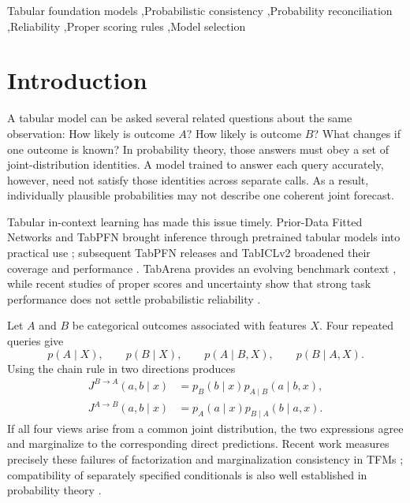 \documentclass[a4paper,fleqn]{cas-sc}
\newcommand{\Jone}{J^{B\rightarrow A}}
\newcommand{\Jtwo}{J^{A\rightarrow B}}
\begin{document}
\begin{keywords}
Tabular foundation models \sep Probabilistic consistency \sep Probability reconciliation \sep Reliability \sep Proper scoring rules \sep Model selection
\end{keywords}

\maketitle

\section{Introduction}
A tabular model can be asked several related questions about the same observation: How likely is outcome $A$? How likely is outcome $B$? What changes if one outcome is known? In probability theory, those answers must obey a set of joint-distribution identities. A model trained to answer each query accurately, however, need not satisfy those identities across separate calls. As a result, individually plausible probabilities may not describe one coherent joint forecast.

Tabular in-context learning has made this issue timely. Prior-Data Fitted Networks and TabPFN brought inference through pretrained tabular models into practical use \citep{muller2022pfns,hollmann2023tabpfn,hollmann2025tabpfn}; subsequent TabPFN releases and TabICLv2 broadened their coverage and performance \citep{grinsztajn2025tabpfn25,grinsztajn2026tabpfn3,qu2026tabiclv2}. TabArena provides an evolving benchmark context \citep{erickson2025tabarena}, while recent studies of proper scores and uncertainty show that strong task performance does not settle probabilistic reliability \citep{landsgesell2026scoringbench,johnson2026uq,costa2026lowreliability,tanna2026ensembling}.

Let $A$ and $B$ be categorical outcomes associated with features $X$. Four repeated queries give
\begin{equation}
p(A\mid X),\qquad p(B\mid X),\qquad p(A\mid B,X),\qquad p(B\mid A,X).
\end{equation}
Using the chain rule in two directions produces
\begin{align}
\Jone(a,b\mid x)&=p_B(b\mid x)p_{A\mid B}(a\mid b,x),\\
\Jtwo(a,b\mid x)&=p_A(a\mid x)p_{B\mid A}(b\mid a,x).
\end{align}
If all four views arise from a common joint distribution, the two expressions agree and marginalize to the corresponding direct predictions. Recent work measures precisely these failures of factorization and marginalization consistency in TFMs \citep{klotergens2026agree}; compatibility of separately specified conditionals is also well established in probability theory \citep{majid2025consistent,mure2017compromise}.
\end{document}
